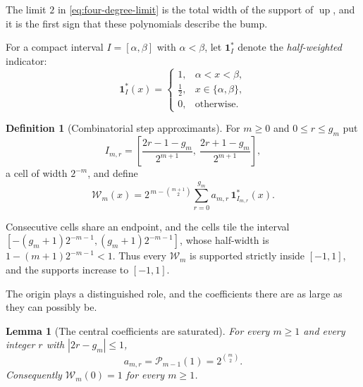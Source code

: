 \documentclass[11pt,oneside]{article}
\newtheorem{lemma}[theorem]{Lemma}
\theoremstyle{definition}
\newtheorem{definition}[theorem]{Definition}
\theoremstyle{remark}
\newcommand{\Up}{\operatorname{up}}
\begin{document}
The limit $2$ in \eqref{eq:four-degree-limit} is the total width of the support of $\Up$, and
it is the first sign that these polynomials describe the bump.

For a compact interval $I=[\alpha,\beta]$ with $\alpha<\beta$, let $\mathbf 1^\ast_I$ denote
the \emph{half-weighted} indicator:
\begin{equation}
 \mathbf 1^\ast_I(x)=
 \begin{cases}
  1,&\alpha<x<\beta,\\
  \tfrac12,&x\in\{\alpha,\beta\},\\
  0,&\text{otherwise}.
 \end{cases}                                              \label{eq:four-half-indicator}
\end{equation}

\begin{definition}[Combinatorial step approximants]
For $m\ge0$ and $0\le r\le g_m$ put
\begin{equation}
 I_{m,r}=\left[\frac{2r-1-g_m}{2^{m+1}},\ \frac{2r+1-g_m}{2^{m+1}}\right],
                                                          \label{eq:four-cell}
\end{equation}
a cell of width $2^{-m}$, and define
\begin{equation}
 \mathcal W_m(x)=2^{\,m-\binom{m+1}{2}}
 \sum_{r=0}^{g_m}a_{m,r}\,\mathbf 1^\ast_{I_{m,r}}(x).    \label{eq:four-step-approximant}
\end{equation}
\end{definition}

Consecutive cells share an endpoint, and the cells tile the interval
$[-(g_m+1)2^{-m-1},(g_m+1)2^{-m-1}]$, whose half-width is
$1-(m+1)2^{-m-1}<1$.  Thus every $\mathcal W_m$ is supported strictly inside $[-1,1]$, and the
supports increase to $[-1,1]$.

The origin plays a distinguished role, and the coefficients there are as large as they can
possibly be.

\begin{lemma}[The central coefficients are saturated]
\label{lem:four-central-coefficient}
For every $m\ge1$ and every integer $r$ with $|2r-g_m|\le1$,
\begin{equation}
 a_{m,r}=\mathcal P_{m-1}(1)=2^{\binom m2}.               \label{eq:four-central-coefficient}
\end{equation}
Consequently $\mathcal W_m(0)=1$ for every $m\ge1$.
\end{lemma}
\end{document}
